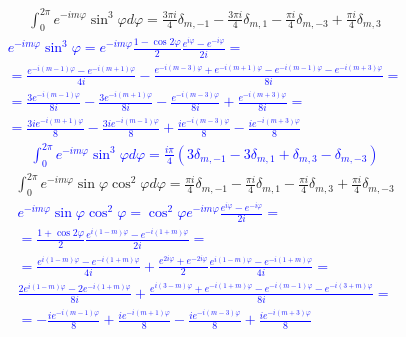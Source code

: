 %
\begin{equation} \begin{aligned} \label{eq:int_exp4}
\int_{0}^{2\pi} e^{-i m \varphi} \sin^3 \varphi d \varphi = 
\frac{3 \pi i}{4} \delta_{m,-1} - \frac{3 \pi i}{4} \delta_{m,1} - 
\frac{\pi i}{4} \delta_{m,-3} + \frac{\pi i}{4} \delta_{m,3}
\end{aligned} \end{equation}
%
\textcolor{blue}{ \begin{equation*} \begin{aligned}
e^{-i m \varphi} \sin^3 \varphi = e^{-i m \varphi} 
\frac{1 - \cos 2\varphi}{2} \frac{e^{i\varphi} - e^{-i\varphi}}{2i} = \\
= \frac{e^{-i(m-1)\varphi} - e^{-i(m+1)\varphi}}{4i} - 
\frac{e^{-i(m-3)\varphi} + e^{-i(m+1)\varphi} -
e^{-i(m-1)\varphi} - e^{-i(m+3)\varphi}}{8i} = \\
= \frac{3 e^{-i(m-1)\varphi}}{8i} - \frac{3 e^{-i(m+1)\varphi}}{8i} - 
\frac{e^{-i(m-3)\varphi}}{8i} + \frac{e^{-i(m+3)\varphi}}{8i} = \\
= \frac{3i e^{-i(m+1)\varphi}}{8} - \frac{3i e^{-i(m-1)\varphi}}{8} + 
\frac{i e^{-i(m-3)\varphi}}{8} - \frac{i e^{-i(m+3)\varphi}}{8} 
\end{aligned} \end{equation*} }
%
\textcolor{blue}{ \begin{equation*} \begin{aligned}
\int_{0}^{2\pi} e^{-i m \varphi} \sin^3 \varphi d \varphi = 
\frac{i\pi}{4} \left( 3 \delta_{m,-1} - 3 \delta_{m,1} + 
\delta_{m,3} - \delta_{m,-3} \right)
\end{aligned} \end{equation*} }
%
\begin{equation} \begin{aligned} \label{eq:int_exp5}
\int_0^{2\pi} e^{-i m \varphi} \sin \varphi \cos^2 \varphi d \varphi = 
\frac{\pi i }{4} \delta_{m,-1} - \frac{\pi i }{4} \delta_{m,1} -
\frac{\pi i }{4} \delta_{m,3} + \frac{\pi i }{4} \delta_{m,-3}
\end{aligned} \end{equation}
%
\textcolor{blue}{ \begin{equation*} \begin{aligned}
e^{-i m \varphi} \sin \varphi \cos^2 \varphi = 
\cos^2 \varphi e^{-i m \varphi} \frac{e^{i\varphi} - e^{-i\varphi}}{2i} = \\
= \frac{1 + \cos 2\varphi}{2} 
\frac{e^{i(1-m)\varphi} - e^{-i(1+m)\varphi}}{2i} = \\
= \frac{e^{i(1-m)\varphi} - e^{-i(1+m)\varphi}}{4i} + 
\frac{e^{2i\varphi} + e^{-2i\varphi}}{2} 
\frac{e^{i(1-m)\varphi} - e^{-i(1+m)\varphi}}{4i} = \\
\frac{ 2 e^{i(1-m)\varphi} - 2 e^{-i(1+m)\varphi}}{8i} +
\frac{e^{i(3-m)\varphi} + e^{-i(1+m)\varphi} - 
e^{-i(m-1)\varphi} - e^{-i(3+m)\varphi}}{8i} = \\
= -\frac{ i e^{-i (m-1) \varphi} }{8} + \frac{ i e^{-i (m+1) \varphi} }{8} -
\frac{ i e^{-i (m-3) \varphi} }{8} + \frac{ i e^{-i (m+3) \varphi} }{8}
\end{aligned} \end{equation*} }
